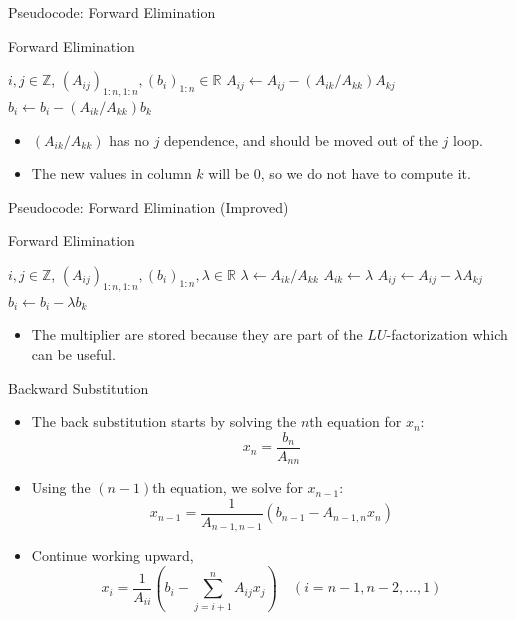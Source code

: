 \documentclass{beamer}
\newcommand{\beforeverb}{\footnotesize}
\newcommand{\afterverb}{\normalsize}
\begin{document}
\begin{frame}{Pseudocode: Forward Elimination}

\begin{block}{Forward Elimination}
\beforeverb
\begin{algorithmic}[1]
\State  $i, j \in \mathbb{Z}$, $(A_{ij})_{1:n,1:n}, (b_i)_{1:n} \in \mathbb{R}$
\State $A_{ij} \gets A_{ij} -(A_{ik}/A_{kk})A_{kj} $
\EndFor
\State $b_i \gets b_i-(A_{ik}/A_{kk})b_k$
\EndFor
\EndFor
\end{algorithmic}
\afterverb
\end{block}
\begin{itemize}
\item  $(A_{ik}/A_{kk})$ has no $j$ dependence, and should be moved out of the $j$ loop.
\item The new values in column $k$ will be 0, so we do not have to compute it.
\end{itemize}
\end{frame}
\begin{frame}{Pseudocode: Forward Elimination (Improved)}

\begin{block}{Forward Elimination}
\beforeverb
\begin{algorithmic}[1]
\State  $i, j \in \mathbb{Z}$, $(A_{ij})_{1:n,1:n}, (b_i)_{1:n}, \lambda \in \mathbb{R}$
\State $\lambda \gets A_{ik}/A_{kk}$
\State $A_{ik}\gets \lambda$
\State $A_{ij} \gets A_{ij} -\lambda A_{kj} $
\EndFor
\State $b_i \gets b_i-\lambda b_k$
\EndFor
\EndFor
\end{algorithmic}
\afterverb
\end{block}
\begin{itemize}
\item  The multiplier are stored because they are part of the \alert{$LU$-factorization} which can be useful. 
\end{itemize}
\end{frame}
\begin{frame}{ Backward Substitution}
\begin{itemize}
\item The back substitution starts by solving the $n$th equation for $x_n$:
\[
x_n=\frac{b_n}{A_{nn}}
\]
\item Using the $(n-1)$th equation, we solve for $x_{n-1}$:
\[
x_{n-1}=\frac{1}{A_{n-1,n-1}}(b_{n-1}-A_{n-1,n}x_n)
\]
\item Continue working upward, 
\[
x_i=\frac{1}{A_{ii}}\left(b_i-\sum_{j=i+1}^n A_{ij}x_j \right)\quad (i=n-1,n-2,\ldots,1)
\]
\end{itemize}
\end{frame}
\end{document}
